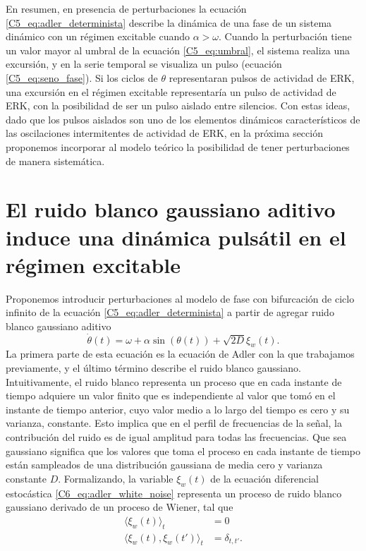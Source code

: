 \documentclass[./main.tex]{subfiles}
\begin{document}
En resumen, en presencia de perturbaciones la ecuación \ref{C5_eq:adler_determinista} describe la dinámica de una fase de un sistema dinámico con un régimen excitable cuando $\alpha > \omega$. Cuando la perturbación tiene un valor mayor al umbral de la ecuación \ref{C5_eq:umbral}, el sistema realiza una excursión, y en la serie temporal se visualiza un pulso (ecuación \ref{C5_eq:seno_fase}). Si los ciclos de $\theta$ representaran pulsos de actividad de ERK, una excursión en el régimen excitable representaría un pulso de actividad de ERK, con la posibilidad de ser un pulso aislado entre silencios. Con estas ideas, dado que los pulsos aislados son uno de los elementos dinámicos característicos de las oscilaciones intermitentes de actividad de ERK, en la próxima sección proponemos incorporar al modelo teórico la posibilidad de tener perturbaciones de manera sistemática.  


\section{El ruido blanco gaussiano aditivo induce una dinámica pulsátil en el régimen excitable }
\label{C6_sec:alder_ruido}

Proponemos introducir perturbaciones al modelo de fase con bifurcación de ciclo infinito de la ecuación \ref{C5_eq:adler_determinista} a partir de agregar ruido blanco gaussiano aditivo \cite{Lindner2004}
\begin{equation}
    \dot{\theta}(t) = \omega + \alpha \sin{(\theta(t))} + \sqrt{2D} \xi_w(t).
    \label{C6_eq:adler_white_noise}
\end{equation}
La primera parte de esta ecuación es la ecuación de Adler con la que trabajamos previamente, y el último término describe el ruido blanco gaussiano. Intuitivamente, el ruido blanco representa un proceso que en cada instante de tiempo adquiere un valor finito que es independiente al valor que tomó en el instante de tiempo anterior, cuyo valor medio a lo largo del tiempo es cero y su varianza, constante. Esto implica que en el perfil de frecuencias de la señal, la contribución del ruido es de igual amplitud para todas las frecuencias. Que sea gaussiano significa que los valores que toma el proceso en cada instante de tiempo están sampleados de una distribución gaussiana de media cero y varianza constante $D$. Formalizando, la variable $\xi_w(t)$ de la ecuación diferencial estocástica \ref{C6_eq:adler_white_noise} representa un proceso de ruido blanco gaussiano derivado de un proceso de Wiener, tal que \cite{SanMiguel2000}
\begin{align}
    \langle \xi_w(t) \rangle_{t} & = 0 \label{C6_eq:wiener_mean}\\
    \langle \xi_w(t),\xi_w(t') \rangle_{t} & = \delta_{t,t'}. \label{C6_eq:wiener_cov}
\end{align}
\end{document}
